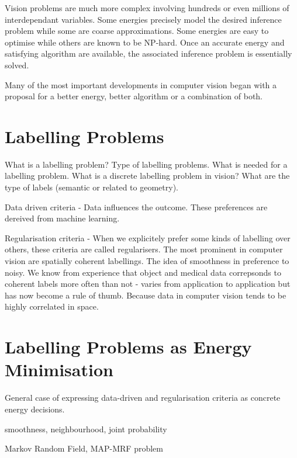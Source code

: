 Vision problems are much more complex involving hundreds or even millions of interdependant variables. Some energies precisely model the desired inference problem while some are coarse approximations. Some energies are easy to optimise while others are known to be NP-hard. Once an accurate energy and satisfying algorithm are available, the associated inference problem is essentially solved.

Many of the most important developments in computer vision began with a proposal for a better energy, better algorithm or a combination of both.


\section{Labelling Problems}

What is a labelling problem? Type of labelling problems. What is needed for a labelling problem. What is a discrete labelling problem in vision? What are the type of labels (semantic or related to geometry).

Data driven criteria - Data influences the outcome. These preferences are dereived from machine learning.

Regularisation criteria - When we explicitely prefer some kinds  of labelling over others, these criteria are called regularisers. The most prominent in computer vision are spatially coherent labellings. The idea of smoothness in preference to noisy. We know from experience that object and medical data correpsonds to coherent labels more often than not - varies from application to application but has now become a rule of thumb. Because data in computer vision tends to be highly correlated in space.


\section{Labelling Problems as Energy Minimisation}

General case of expressing data-driven and regularisation criteria as concrete energy decisions.

smoothness, neighbourhood, joint probability

Markov Random Field, MAP-MRF problem

